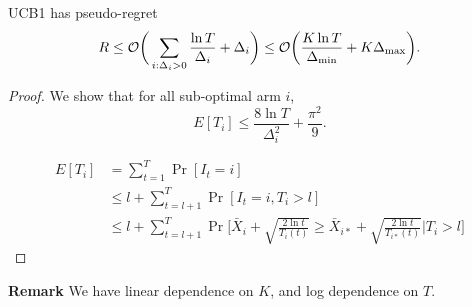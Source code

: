 \begin{thm}
    UCB1 has pseudo-regret
    \begin{equation}
        R \le \mathcal{O}\bigg(\sum_{i:\Delta_i>0} \frac{\ln T}{\Delta_i}+\Delta_i\bigg)
            \le \mathcal{O}\bigg(\frac{K\ln T}{\Delta_\text{min}}+K\Delta_\text{max}\bigg).
    \end{equation}
\end{thm}
\begin{proof}
    We show that for all sub-optimal arm $i$,
    \begin{equation}
        E[T_i] \le \frac{8\ln T}{\Delta_i^2} + \frac{\pi^2}{9}.
    \end{equation}

    \begin{align}
        E[T_i]
            &= \sum_{t=1}^T \Pr[I_t=i] \\
            &\le l + \sum_{t=l+1}^T \Pr[I_t=i, T_i>l] \\
            &\le l + \sum_{t=l+1}^T \Pr\bigg[\bar X_i + \sqrt{\frac{2\ln t}{T_i(t)}}\ge \bar X_{i*}+\sqrt{\frac{2\ln t}{T_{i*}(t)}}\bigg|T_i>l\bigg]
    \end{align}
\end{proof}

\textbf{Remark}
We have linear dependence on $K$,
and log dependence on $T$.
